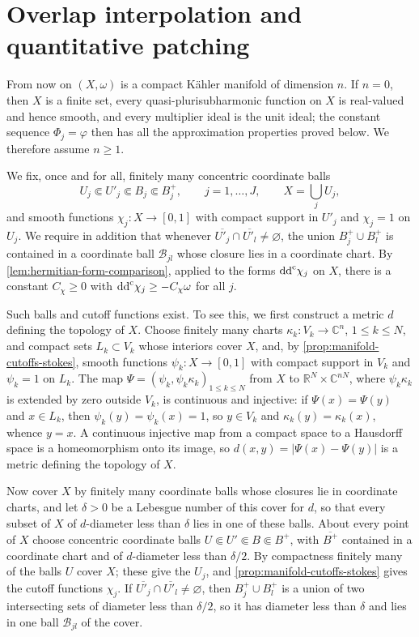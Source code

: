 
\section{Overlap interpolation and quantitative patching}
\label{sec:quantitative-regularization}

From now on $(X,\omega)$ is a compact K\"ahler manifold of dimension $n$. If $n=0$, then $X$ is a finite set, every quasi-plurisubharmonic function on $X$ is real-valued and hence smooth, and every multiplier ideal is the unit ideal; the constant sequence $\Phi_j=\varphi$ then has all the approximation properties proved below. We therefore assume $n\geq1$.

We fix, once and for all, finitely many concentric coordinate balls
\[
 U_j\Subset U'_j\Subset B_j\Subset B_j^+,
 \qquad j=1,\ldots,J,\qquad X=\bigcup_jU_j,
\]
and smooth functions $\chi_j\colon X\to[0,1]$ with compact support in $U'_j$ and $\chi_j=1$ on $U_j$. We require in addition that whenever $\overline{U'_j}\cap\overline{U'_l}\neq\varnothing$, the union $B_j^+\cup B_l^+$ is contained in a coordinate ball $\mathcal B_{jl}$ whose closure lies in a coordinate chart. By \cref{lem:hermitian-form-comparison}, applied to the forms $\mathrm{dd}^{\mathrm{c}}\chi_j$ on $X$, there is a constant $C_\chi\geq0$ with $\mathrm{dd}^{\mathrm{c}}\chi_j\geq-C_\chi\omega$ for all $j$.

Such balls and cutoff functions exist. To see this, we first construct a metric $d$ defining the topology of $X$. Choose finitely many charts $\kappa_k\colon V_k\to\mathbb C^n$, $1\leq k\leq N$, and compact sets $L_k\subset V_k$ whose interiors cover $X$, and, by \cref{prop:manifold-cutoffs-stokes}, smooth functions $\psi_k\colon X\to[0,1]$ with compact support in $V_k$ and $\psi_k=1$ on $L_k$. The map $\Psi=(\psi_k,\psi_k\kappa_k)_{1\leq k\leq N}$ from $X$ to $\mathbb R^N\times\mathbb C^{nN}$, where $\psi_k\kappa_k$ is extended by zero outside $V_k$, is continuous and injective: if $\Psi(x)=\Psi(y)$ and $x\in L_k$, then $\psi_k(y)=\psi_k(x)=1$, so $y\in V_k$ and $\kappa_k(y)=\kappa_k(x)$, whence $y=x$. A continuous injective map from a compact space to a Hausdorff space is a homeomorphism onto its image, so $d(x,y)=|\Psi(x)-\Psi(y)|$ is a metric defining the topology of $X$.

Now cover $X$ by finitely many coordinate balls whose closures lie in coordinate charts, and let $\delta>0$ be a Lebesgue number of this cover for $d$, so that every subset of $X$ of $d$-diameter less than $\delta$ lies in one of these balls. About every point of $X$ choose concentric coordinate balls $U\Subset U'\Subset B\Subset B^+$, with $\overline{B^+}$ contained in a coordinate chart and of $d$-diameter less than $\delta/2$. By compactness finitely many of the balls $U$ cover $X$; these give the $U_j$, and \cref{prop:manifold-cutoffs-stokes} gives the cutoff functions $\chi_j$. If $\overline{U'_j}\cap\overline{U'_l}\neq\varnothing$, then $B_j^+\cup B_l^+$ is a union of two intersecting sets of diameter less than $\delta/2$, so it has diameter less than $\delta$ and lies in one ball $\mathcal B_{jl}$ of the cover.


